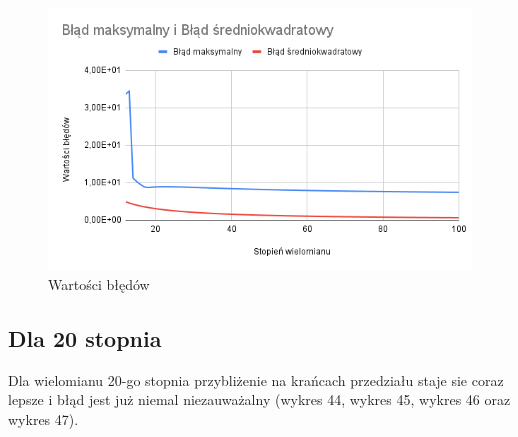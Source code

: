 \documentclass{article}
\begin{document}
\begin{figure}[H]
  \centering
  \begin{minipage}[b]{0.4\textwidth}
    \includegraphics[width=\textwidth]{img43.png}
    \caption{Wartości błędów}
  \end{minipage}
\end{figure}

\newpage

\subsection{Dla 20 stopnia}

\noindent
Dla wielomianu 20-go stopnia przybliżenie na krańcach przedziału staje sie coraz lepsze i błąd jest już niemal niezauważalny (wykres 44, wykres 45, wykres 46 oraz wykres 47).
\end{document}
